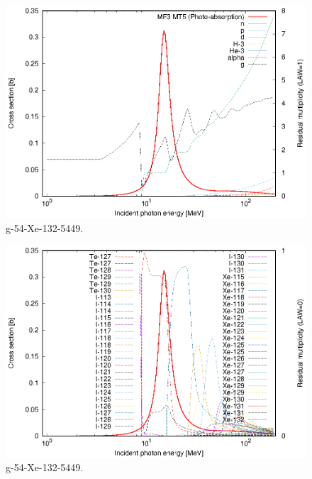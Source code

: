 \begin{figure}
 \includegraphics[width=\linewidth]{eps/g_54-Xe-132_5449.eps}
  \caption{g-54-Xe-132-5449.}
\end{figure}
\begin{figure}
 \includegraphics[width=\linewidth]{eps-law0/g_54-Xe-132_5449.eps}
 \caption{g-54-Xe-132-5449.}
\end{figure}
\newpage \clearpage

